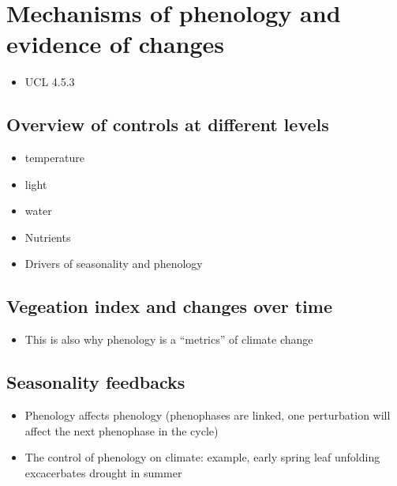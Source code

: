 \documentclass[
  oneside]{book}
\providecommand{\tightlist}{%
  \setlength{\itemsep}{0pt}\setlength{\parskip}{0pt}}
\begin{document}
\hypertarget{mechanisms-of-phenology-and-evidence-of-changes}{%
\section{Mechanisms of phenology and evidence of changes}\label{mechanisms-of-phenology-and-evidence-of-changes}}

\begin{itemize}
\tightlist
\item
  UCL 4.5.3
\end{itemize}

\hypertarget{overview-of-controls-at-different-levels}{%
\subsection{Overview of controls at different levels}\label{overview-of-controls-at-different-levels}}

\begin{itemize}
\tightlist
\item
  temperature
\item
  light
\item
  water
\item
  Nutrients
\item
  Drivers of seasonality and phenology
\end{itemize}

\hypertarget{vegeation-index-and-changes-over-time}{%
\subsection{Vegeation index and changes over time}\label{vegeation-index-and-changes-over-time}}

\begin{itemize}
\tightlist
\item
  This is also why phenology is a ``metrics'' of climate change
\end{itemize}

\hypertarget{seasonality-feedbacks}{%
\subsection{Seasonality feedbacks}\label{seasonality-feedbacks}}

\begin{itemize}
\tightlist
\item
  Phenology affects phenology (phenophases are linked, one perturbation will affect the next phenophase in the cycle)
\item
  The control of phenology on climate: example, early spring leaf unfolding excacerbates drought in summer
\end{itemize}
\end{document}
